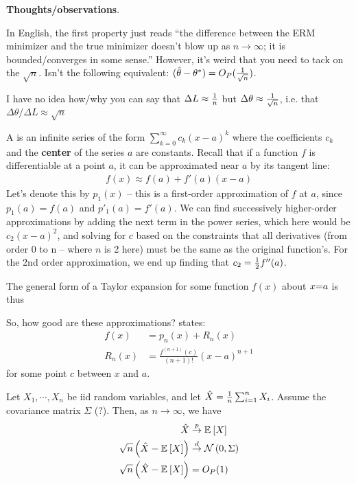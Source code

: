 \documentclass[11pt]{article}
\begin{document}
\textbf{Thoughts/observations}. 
\begin{compactitem}
	\item In English, the first property just reads ``the difference between the ERM  minimizer and the true minimizer doesn't blow up as $n \to \infty$; it is bounded/converges in some sense.'' However, it's weird that you need to tack on the $\sqrt n$. Isn't the following equivalent: $(\hat\theta - \theta^*) = O_P(\frac{1}{\sqrt{n}})$. 
	
	\item I have no idea how/why you can say that $\Delta L \approx \frac{1}{n}$ but $\Delta \theta \approx \frac{1}{\sqrt{n}}$, i.e. that $\Delta \theta / \Delta L \approx \sqrt{n}$
\end{compactitem}

\begin{example}
	A  is an infinite series of the form $\sum_{k=0}^{\infty} c_k (x - a)^k$ where the coefficients $c_k$ and the \textbf{center} of the series $a$ are constants. Recall that if a function $f$ is differentiable at a point $a$, it can be approximated near $a$ by its tangent line:
	\begin{align}
		f(x) \approx f(a) + f'(a) (x - a)
	\end{align}
	Let's denote this by $p_1(x)$ -- this is a first-order approximation of $f$ at $a$, since $p_1(a) = f(a)$ and $p'_1(a) = f'(a)$. We can find successively higher-order approximations by adding the next term in the power series, which here would be $c_2(x - a)^2$, and solving for $c$ based on the constraints that all derivatives (from order 0 to n -- where $n$ is 2 here) must be the same as the original function's. For the 2nd order approximation, we end up finding that $c_2 = \frac{1}{2} f''(a)$. 
	
	The general form of a Taylor expansion for some function $f(x)$ about $x {=} a$ is thus
	
	So, how good are these approximations?  states:
	\begin{align}
		f(x) 
		&= p_n(x) + R_n(x) \\
		R_n(x) 
		&= \frac{  f^{ (n+1)}(c) }{ (n + 1)! } (x - a)^{n+1} 
	\end{align}
	for some point $c$ between $x$ and $a$. 
\end{example}

\begin{example}
	Let $X_1, \cdots, X_n$ be iid random variables, and let $\hat X = \frac{1}{n} \sum_{i=1}^{n} X_i$. Assume the covariance matrix $\Sigma$  (?). Then, as $n \to \infty$, we have 
	\begin{align}
		\hat{X} &\overset{p}{\to} \mathbb{E}_{}\left[X\right] \\
		\sqrt{n}\left(   \hat X - \mathbb{E}_{}\left[X\right]  \right) 
			&\overset{d}{\to} \mathcal{N}\left( 0, \Sigma \right) \\
		\sqrt{n}\left(   \hat X - \mathbb{E}_{}\left[X\right]  \right) 
			&= O_P(1)
	\end{align}
\end{example}
\end{document}

